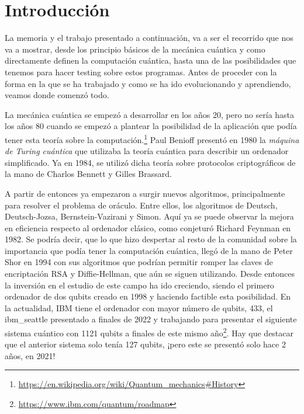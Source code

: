 \cleardoublepage

\chapter{Introducción}
\label{Cap1:Intro}
La memoria y el trabajo presentado a continuación, va a ser el recorrido que nos va a mostrar, desde los principio básicos de la mecánica cuántica y como directamente definen la computación cuántica, hasta una de las posibilidades que tenemos para hacer testing sobre estos programas. Antes de proceder con la forma en la que se ha trabajado y como se ha ido evolucionando y aprendiendo, veamos donde comenzó todo. \newline

La mecánica cuántica se empezó a desarrollar en los años 20, pero no sería hasta los años 80 cuando se empezó a plantear la posibilidad de la aplicación que podía tener esta teoría sobre la computación\cite{B:QuantumScientist:2008}.\footnote{\url{https://en.wikipedia.org/wiki/Quantum_mechanics\#History}} Paul Benioff presentó en 1980 la \textit{máquina de Turing cuántica} que utilizaba la teoría cuántica para describir un ordenador simplificado. Ya en 1984, se utilizó dicha teoría sobre protocolos criptográficos de la mano de Charlos Bennett y Gilles Brassard. \newline

A partir de entonces ya empezaron a surgir nuevos algoritmos, principalmente para resolver el problema de oráculo. Entre ellos, los algoritmos de Deutsch, Deutsch-Jozsa, Bernstein-Vazirani y Simon. Aquí ya se puede observar la mejora en eficiencia respecto al ordenador clásico, como conjeturó Richard Feynman en 1982\cite{AR:Feynman:1982}. Se podría decir, que lo que hizo despertar al resto de la comunidad sobre la importancia que podía tener la computación cuántica, llegó de la mano de Peter Shor en 1994 con sus algoritmos que podrían permitir romper las claves de encriptación RSA y Diffie-Hellman, que aún se siguen utilizando. Desde entonces la inversión en el estudio de este campo ha ido creciendo, siendo el primero ordenador de dos qubits creado en 1998 y haciendo factible esta posibilidad. En la actualidad, IBM tiene el ordenador con mayor número de qubits, 433, el ibm\_seattle presentado a finales de 2022 y trabajando para presentar el siguiente sistema cuántico con 1121 qubits a finales de este mismo año\footnote{\url{https://www.ibm.com/quantum/roadmap}}. Hay que destacar que el anterior sistema solo tenía 127 qubits, ¡pero este se presentó solo hace 2 años, en 2021! \newline

